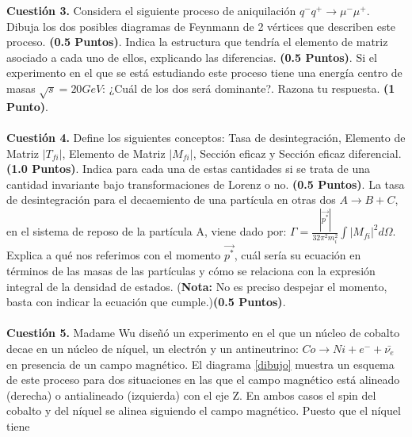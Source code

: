 \documentclass[paper=a4, fontsize=11pt]{scrartcl} %
\numberwithin{equation}{section} %
\numberwithin{figure}{section} %
\numberwithin{table}{section} %
\begin{document}
\textbf{Cuestión 3.} Considera el siguiente proceso de aniquilación $q^{-}q^{+}\rightarrow\mu^{-}\mu^{+}$. Dibuja los dos posibles diagramas de Feynmann de 2 vértices que describen este proceso. \textbf{(0.5 Puntos)}. Indica
la estructura que tendría el elemento de matriz asociado a cada uno de ellos, explicando las diferencias. \textbf{(0.5 Puntos)}. Si el experimento en el que se está estudiando este proceso tiene una energía centro de 
masas $\sqrt{s}=20 GeV$: ¿Cuál de los dos será dominante?. Razona tu respuesta. \textbf{(1 Punto)}.  
\\
\\
\textbf{Cuestión 4.} Define los siguientes conceptos: Tasa de desintegración, Elemento de Matriz $|T_{fi}|$, Elemento de Matriz $|M_{fi}|$, Sección eficaz y Sección eficaz diferencial. \textbf{(1.0 Puntos)}. Indica para cada una
de estas cantidades si se trata de una cantidad invariante bajo transformaciones de Lorenz o no. \textbf{(0.5 Puntos)}. La tasa de desintegración para el decaemiento de una partícula en otras dos $A\rightarrow B + C$, en
el sistema de reposo de la partícula A, viene dado por: $\Gamma = \frac{|\vec{p^{*}}|}{32\pi^2m_i^2} \int |M_{fi}|^2 d\Omega$. Explica a qué nos referimos con el momento $\vec{p^{*}}$, cuál sería su ecuación en términos de las masas de las partículas y cómo se relaciona con la expresión integral de la densidad de
estados. (\textbf{Nota:} No es preciso despejar el momento, basta con indicar la ecuación que cumple.)\textbf{(0.5 Puntos)}.
\\
\\
\textbf{Cuestión 5.} Madame Wu diseñó un experimento en el que un núcleo de cobalto decae en un núcleo de níquel, un electrón y un antineutrino: $Co\rightarrow Ni + e^{-} + \bar{\nu_e}$ en presencia de un campo magnético. El diagrama \ref{dibujo}
muestra un esquema de este proceso para dos situaciones en las que el campo magnético está alineado (derecha) o antialineado (izquierda) con el eje Z. En ambos casos el spin del cobalto y del níquel se alinea siguiendo el campo magnético. Puesto que el níquel tiene 
\end{document}
